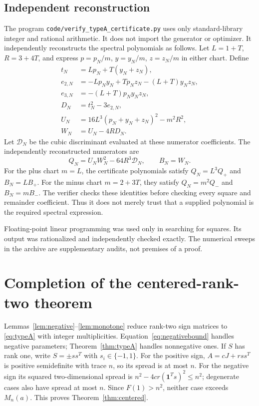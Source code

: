 \documentclass[11pt]{article}
\begin{document}
\subsection{Independent reconstruction}
The program \texttt{code/verify\_typeA\_certificate.py} uses only standard-library
integer and rational arithmetic. It does not import the generator or optimizer.
It independently reconstructs the spectral polynomials as follows. Let
$L=1+T$, $R=3+4T$, and express $p=p_N/m$, $y=y_N/m$, $z=z_N/m$ in either chart.
Define
\begin{align*}
 t_N&=Lp_N+T(y_N+z_N),\\
 e_{2,N}&=-Lp_Ny_N+Tp_Nz_N-(L+T)y_Nz_N,\\
 e_{3,N}&=-(L+T)p_Ny_Nz_N,\\
 D_N&=t_N^2-3e_{2,N},\\
 U_N&=16L^3(p_N+y_N+z_N)^2-m^2R^2,\\
 W_N&=U_N-4RD_N.
\end{align*}
Let $\mathcal D_N$ be the cubic discriminant evaluated at these numerator
coefficients. The independently reconstructed numerators are
\[
 Q_N=U_NW_N^2-64R^3\mathcal D_N,\qquad B_N=W_N.
\]
For the plus chart $m=L$, the certificate polynomials satisfy
$Q_N=L^3Q_+$ and $B_N=LB_+$. For the minus chart $m=2+3T$, they satisfy
$Q_N=m^2Q_-$ and $B_N=mB_-$. The verifier checks these identities before
checking every square and remainder coefficient. Thus it does not merely
trust that a supplied polynomial is the required spectral expression.

Floating-point linear programming was used only in searching for squares.
Its output was rationalized and independently checked exactly. The numerical
sweeps in the archive are supplementary audits, not premises of a proof.

\section{Completion of the centered-rank-two theorem}
Lemmas~\ref{lem:negative}--\ref{lem:monotone} reduce rank-two sign matrices
to \eqref{eq:typeA} with integer multiplicities. Equation~\eqref{eq:negativebound}
handles negative parameters; Theorem~\ref{thm:typeA} handles nonnegative ones.
If $S$ has rank one, write $S=\pm ss^T$ with $s_i\in\{-1,1\}$.
For the positive sign, $A=cJ+rss^T$ is positive semidefinite with trace $n$,
so its spread is at most $n$. For the negative sign its squared two-dimensional
spread is $n^2-4cr(\mathbf1^Ts)^2\le n^2$; degenerate cases also have spread
at most $n$. Since $F(1)>n^2$, neither case exceeds $M_n(a)$.
This proves Theorem~\ref{thm:centered}.
\end{document}
